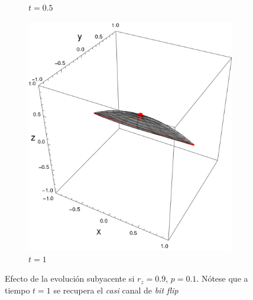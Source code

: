 \begin{figure}[ht!]
\begin{subfigure}{0.32\textwidth}
    \caption{$t=0.5$}
  \end{subfigure}
  \begin{subfigure}{0.32\textwidth}
    \centering
    \includegraphics[width=0.9\linewidth]{chapter3/figures_toy/sphere_CNOT_t=1._r=0.9_p=0.1.png}
    \caption{$t=1$}
  \end{subfigure}
  \caption{Efecto de la evolución subyacente si $r_{z}=0.9$, $p=0.1$. Nótese que a tiempo $t=1$ se recupera el \textit{casi} canal de \textit{bit flip}}
  \label{fig:AlmostBitFlipSequence}
  \end{figure}


